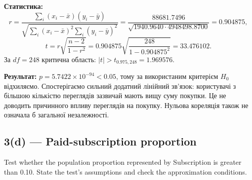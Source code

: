 \documentclass[11pt]{article}
\begin{document}
\textbf{Статистика:}
\[r=\frac{\sum_i(x_i-\bar x)(y_i-\bar y)}{\sqrt{\sum_i(x_i-\bar x)^2\sum_i(y_i-\bar y)^2}}
=\frac{88681.7496}{\sqrt{1940.9640\cdot4948498.8700}}=0.904875,\]
\[t=r\sqrt{\frac{n-2}{1-r^2}}=0.904875\sqrt{\frac{248}{1-0.904875^2}}=33.476102.\]
За \(df=248\) критична область: \(|t|>t_{0.975,248}=1.969576\).

\textbf{Результат:} \(p=5.7422\times 10^{-94}<0.05\), тому за
використаним критерієм \(H_0\) відхиляємо. Спостерігаємо сильний
додатний лінійний зв'язок: користувачі з більшою кількістю переглядів
зазвичай мають вищу суму покупки. Це не доводить причинного впливу
переглядів на покупку. Нульова кореляція також не означала б загальної
незалежності.

    \subsection{3(d) --- Paid-subscription
proportion}\label{d-paid-subscription-proportion}

Test whether the population proportion represented by Subscription is
greater than 0.10. State the test's assumptions and check the
approximation conditions.
\end{document}
